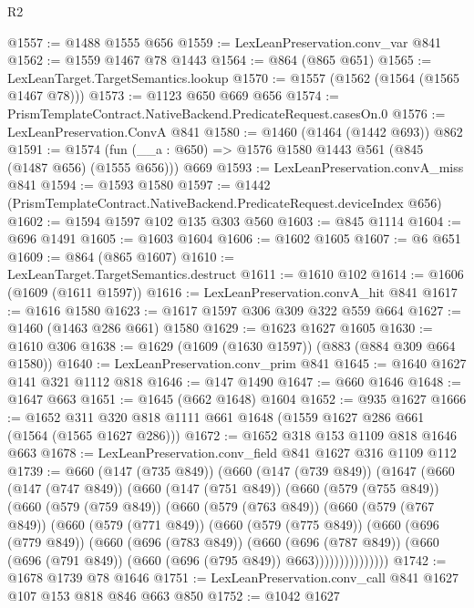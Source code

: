 \begin{lexlean}{R2}
\begin{coremodule}
@1557 := @1488 @1555 @656
@1559 := LexLeanPreservation.conv_var @841
@1562 := @1559 @1467 @78 @1443
@1564 := @864 (@865 @651)
@1565 := LexLeanTarget.TargetSemantics.lookup
@1570 := @1557 (@1562 (@1564 (@1565 @1467 @78)))
@1573 := @1123 @650 @669 @656
@1574 := PrismTemplateContract.NativeBackend.PredicateRequest.casesOn.{0}
@1576 := LexLeanPreservation.ConvA @841
@1580 := @1460 (@1464 (@1442 @693)) @862
@1591 := @1574 (fun (__a : @650) => @1576 @1580 @1443 @561 (@845 (@1487 @656) (@1555 @656))) @669
@1593 := LexLeanPreservation.convA_miss @841
@1594 := @1593 @1580
@1597 := @1442 (PrismTemplateContract.NativeBackend.PredicateRequest.deviceIndex @656)
@1602 := @1594 @1597 @102 @135 @303 @560
@1603 := @845 @1114
@1604 := @696 @1491
@1605 := @1603 @1604
@1606 := @1602 @1605
@1607 := @6 @651
@1609 := @864 (@865 @1607)
@1610 := LexLeanTarget.TargetSemantics.destruct
@1611 := @1610 @102
@1614 := @1606 (@1609 (@1611 @1597))
@1616 := LexLeanPreservation.convA_hit @841
@1617 := @1616 @1580
@1623 := @1617 @1597 @306 @309 @322 @559 @664
@1627 := @1460 (@1463 @286 @661) @1580
@1629 := @1623 @1627 @1605
@1630 := @1610 @306
@1638 := @1629 (@1609 (@1630 @1597)) (@883 (@884 @309 @664 @1580))
@1640 := LexLeanPreservation.conv_prim @841
@1645 := @1640 @1627 @141 @321 @1112 @818
@1646 := @147 @1490
@1647 := @660 @1646
@1648 := @1647 @663
@1651 := @1645 (@662 @1648) @1604
@1652 := @935 @1627
@1666 := @1652 @311 @320 @818 @1111 @661 @1648 (@1559 @1627 @286 @661 (@1564 (@1565 @1627 @286)))
@1672 := @1652 @318 @153 @1109 @818 @1646 @663
@1678 := LexLeanPreservation.conv_field @841 @1627 @316 @1109 @112
@1739 := @660
    (@147 (@735 @849))
    (@660
      (@147 (@739 @849))
      (@1647
        (@660
          (@147 (@747 @849))
          (@660
            (@147 (@751 @849))
            (@660
              (@579 (@755 @849))
              (@660
                (@579 (@759 @849))
                (@660
                  (@579 (@763 @849))
                  (@660
                    (@579 (@767 @849))
                    (@660
                      (@579 (@771 @849))
                      (@660
                        (@579 (@775 @849))
                        (@660
                          (@696 (@779 @849))
                          (@660
                            (@696 (@783 @849))
                            (@660
                              (@696 (@787 @849))
                              (@660 (@696 (@791 @849)) (@660 (@696 (@795 @849)) @663)))))))))))))))
@1742 := @1678 @1739 @78 @1646
@1751 := LexLeanPreservation.conv_call @841 @1627 @107 @153 @818 @846 @663 @850
@1752 := @1042 @1627

\end{coremodule}
\end{lexlean}
